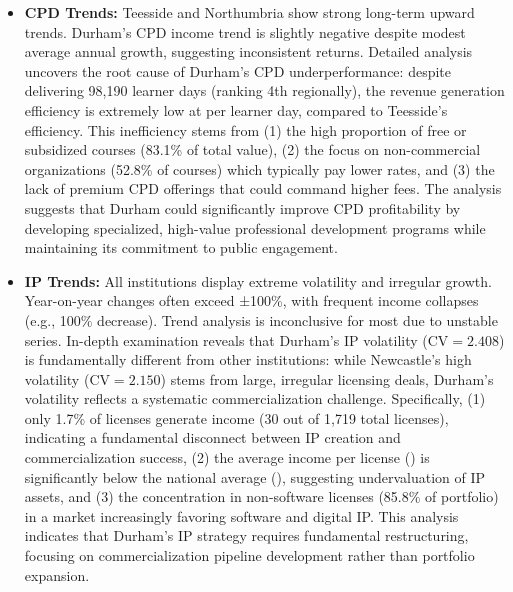 \documentclass[journal,onecolumn, 10pt,draftclsnofoot]{IEEEtran}
\begin{document}
\begin{itemize}
    \item \textbf{CPD Trends:} Teesside and Northumbria show strong long-term upward trends. Durham's CPD income trend is slightly negative despite modest average annual growth, suggesting inconsistent returns. Detailed analysis uncovers the root cause of Durham's CPD underperformance: despite delivering 98,190 learner days (ranking 4th regionally), the revenue generation efficiency is extremely low at  per learner day, compared to Teesside's  efficiency. This inefficiency stems from (1) the high proportion of free or subsidized courses (83.1\% of total value), (2) the focus on non-commercial organizations (52.8\% of courses) which typically pay lower rates, and (3) the lack of premium CPD offerings that could command higher fees. The analysis suggests that Durham could significantly improve CPD profitability by developing specialized, high-value professional development programs while maintaining its commitment to public engagement.
    
    \item \textbf{IP Trends:} All institutions display extreme volatility and irregular growth. Year-on-year changes often exceed ±100\%, with frequent income collapses (e.g., 100\% decrease). Trend analysis is inconclusive for most due to unstable series. In-depth examination reveals that Durham's IP volatility ($\mathrm{CV}=2.408$) is fundamentally different from other institutions: while Newcastle's high volatility ($\mathrm{CV}=2.150$) stems from large, irregular licensing deals, Durham's volatility reflects a systematic commercialization challenge. Specifically, (1) only 1.7\% of licenses generate income (30 out of 1,719 total licenses), indicating a fundamental disconnect between IP creation and commercialization success, (2) the average income per license () is significantly below the national average (), suggesting undervaluation of IP assets, and (3) the concentration in non-software licenses (85.8\% of portfolio) in a market increasingly favoring software and digital IP. This analysis indicates that Durham's IP strategy requires fundamental restructuring, focusing on commercialization pipeline development rather than portfolio expansion.
\end{itemize}
\end{document}
